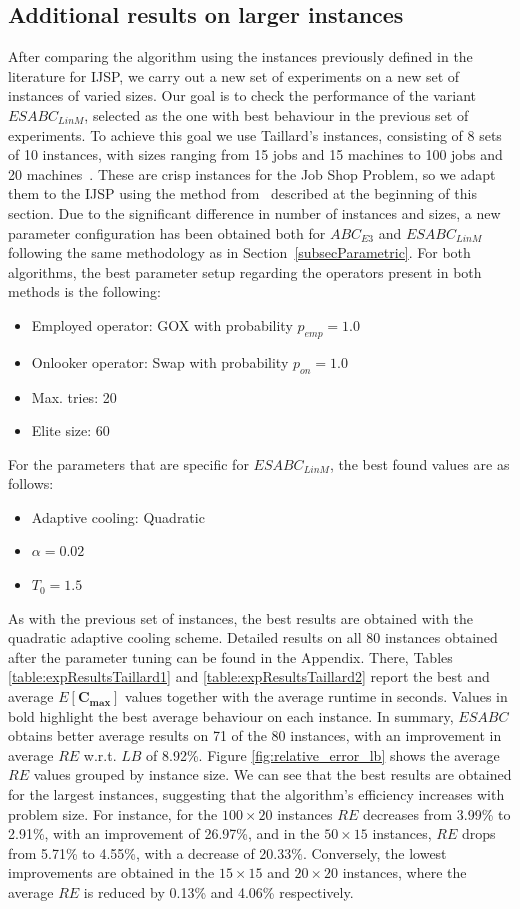 \documentclass[icae]{iosart2x}
\newcommand{\reviewed}[1]{#1} %
\begin{document}
\subsection{Additional results on larger instances}
\reviewed{After comparing the algorithm using the instances previously defined in the literature for IJSP, we carry out a new set of experiments on a new set of instances of varied sizes.  Our goal is to check the performance of the variant $ESABC_{LinM}$, selected as the one with best behaviour in the previous set of experiments. To achieve this goal we use Taillard's instances, consisting of 8 sets of 10 instances, with sizes ranging from 15 jobs and 15 machines to 100 jobs and 20 machines~\cite{Taillard1993}. These are crisp instances for the Job Shop Problem, so we adapt them to the IJSP using the method from~\cite{Diaz2020genetic} described at the beginning of this section. Due to the significant difference in number of instances and sizes, a new parameter configuration has been obtained both for $ABC_{E3}$ and $ESABC_{LinM}$ following the same methodology as in Section~\ref{subsecParametric}. For both algorithms, the best parameter setup regarding the operators present in both methods is the following:
\begin{itemize}
\item Employed operator: GOX with probability $p_{emp}=1.0$
\item Onlooker operator: Swap with probability $p_{on}=1.0$
\item Max. tries: 20
\item Elite size: 60
\end{itemize}
For the parameters that are specific for $ESABC_{LinM}$, the best found values are as follows:
\begin{itemize}
\item Adaptive cooling: Quadratic
\item $\alpha=0.02$
\item $T_0=1.5$
\end{itemize}
As with the previous set of instances, the best results are obtained with the quadratic adaptive cooling scheme. Detailed results on all 80 instances obtained after the parameter tuning can be found in the Appendix. There, Tables \ref{table:expResultsTaillard1} and \ref{table:expResultsTaillard2} report the best and average $E[\mathbf{C_{max}}]$ values together with the average runtime in seconds. Values in bold highlight the best average behaviour on each instance. In summary, $ESABC$ obtains better average results on 71 of the 80 instances, with an improvement in average $RE$ w.r.t. $LB$ of 8.92\%. Figure \ref{fig:relative_error_lb} shows the average $RE$ values grouped by instance size. We can see that the best results are obtained for the largest instances, suggesting that the algorithm's efficiency increases with problem size. For instance, for the $100 \times 20$ instances $RE$ decreases from 3.99\% to 2.91\%, with an improvement of 26.97\%, and in the $50 \times 15$ instances, $RE$ drops from 5.71\% to 4.55\%, with a decrease of 20.33\%. Conversely, the lowest improvements are obtained in the $15 \times 15$ and $20 \times 20$ instances, where the average $RE$ is reduced by 0.13\% and 4.06\% respectively.}
\end{document}
